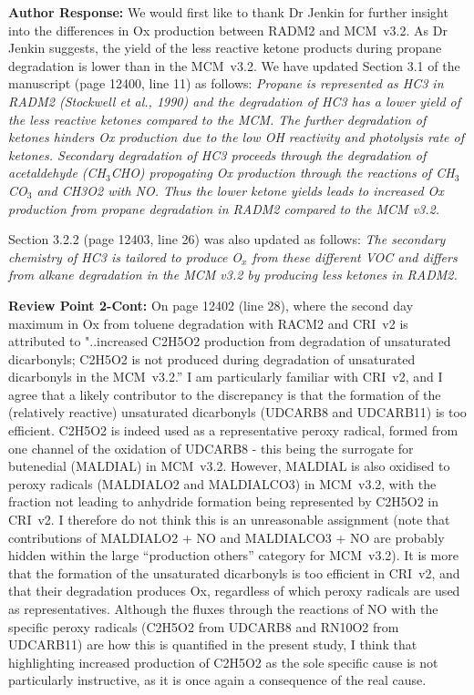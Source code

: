 \documentclass{article}
\begin{document}
\textbf{Author Response:} We would first like to thank Dr Jenkin for further insight into the differences in Ox production between RADM2 and MCM~v3.2. 
As Dr Jenkin suggests, the yield of the less reactive ketone products during propane degradation is lower than in the MCM~v3.2.
We have updated Section 3.1 of the manuscript (page 12400, line 11) as follows:
\textit{ Propane is represented as HC3 in RADM2 (Stockwell et al., 1990) and the degradation of HC3 has a lower yield of the less reactive ketones compared to the MCM. The further degradation of ketones hinders Ox production due to the low OH reactivity and photolysis rate of ketones. Secondary degradation of HC3 proceeds through the degradation of acetaldehyde (CH$_3$CHO) propogating Ox production through the reactions of CH$_3$CO$_3$ and CH3O2 with NO. Thus the lower ketone yields leads to increased Ox production from propane degradation in RADM2 compared to the MCM v3.2.}

Section 3.2.2 (page 12403, line 26) was also updated as follows:
\textit{The secondary chemistry of HC3 is tailored to produce O$_{x}$ from these different VOC and differs from alkane degradation in the MCM v3.2 by producing less ketones in RADM2.}

\textbf{Review Point 2-Cont:} On page 12402 (line 28), where the second day maximum in Ox from toluene degradation with RACM2 and CRI~v2 is attributed to "..increased C2H5O2 production from degradation of unsaturated dicarbonyls; C2H5O2 is not produced during degradation of unsaturated dicarbonyls in the MCM~v3.2.'' I am particularly familiar with CRI~v2, and I agree that a likely contributor to the discrepancy is that the formation of the (relatively reactive) unsaturated dicarbonyls (UDCARB8 and UDCARB11) is too efficient. C2H5O2 is indeed used as a representative peroxy radical, formed from one channel of the oxidation of UDCARB8 - this being the surrogate for butenedial (MALDIAL) in MCM~v3.2. However, MALDIAL is also oxidised to peroxy radicals (MALDIALO2 and MALDIALCO3) in MCM~v3.2, with the fraction not leading to anhydride formation being represented by C2H5O2 in CRI~v2. I therefore do not think this is an unreasonable assignment (note that contributions of MALDIALO2 + NO and MALDIALCO3 + NO are probably hidden within the large ``production others'' category for MCM~v3.2). It is more that the formation of the unsaturated dicarbonyls is too efficient in CRI~v2, and that their degradation produces Ox, regardless of which peroxy radicals are used as representatives. Although the fluxes through the reactions of NO with the specific peroxy radicals (C2H5O2 from UDCARB8 and RN10O2 from UDCARB11) are how this is quantified in the present study, I think that highlighting increased production of C2H5O2 as the sole specific cause is not particularly instructive, as it is once again a consequence of the real cause.
\end{document}
